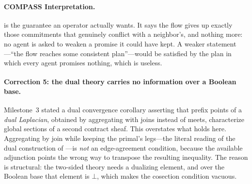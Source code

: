 \documentclass[11pt]{article}
\newif\ifshowcomments
\theoremstyle{definition}
\theoremstyle{remark}
\newcommand{\ai}[1]{%
    \ifshowcomments
        \noindent\textcolor{techred}{[AI Agent]: #1}%
    \fi
}
\begin{document}
\paragraph{COMPASS Interpretation.}
 is the guarantee an operator actually wants.
It says the flow gives up exactly those commitments that genuinely conflict with a neighbor's,
and nothing more: no agent is asked to weaken a promise it could have kept.
A weaker statement---``the flow reaches some consistent plan''---would be satisfied by the plan
in which every agent promises nothing, which is useless.

\paragraph{Correction 5: the dual theory carries no information over a Boolean base.}
Milestone~3 stated a dual convergence corollary asserting that prefix points of a
\emph{dual Laplacian}, obtained by aggregating with joins instead of meets, characterize global
sections of a second contract sheaf.
This overstates what holds here.
Aggregating by join while keeping the primal's legs---the literal reading of the dual construction of
\citet{ghristCategoricalDiffusionWeighted2026}---is \emph{not} an edge-agreement condition,
because the available adjunction points the wrong way to transpose the resulting inequality.
The reason is structural: the two-sided theory needs a dualizing element, and over the Boolean
base that element is $\bot$, which makes the cosection condition vacuous.

\ai{\textbf{Correction 5.} Concretely, and both recorded as tests:
\testname{test_kan_prefix_is_not_an_agreement_condition} exhibits an assignment that is a
prefix point of the join-aggregated primal Laplacian and is not a global section; and
\testname{test_harmonic_is_strictly_stronger_than_being_a_section} exhibits a strict global
section that is not harmonic, so the two-sided condition is strictly stronger than sectionhood
rather than a characterization of it. Milestone~3's dual corollary should be read as applying
only to the \emph{dual sheaf of \Cref{tab:two-sheaves}}---aggregating by join \emph{and}
transporting along $R^{\circ} \dashv R_*$---where it does hold, and where its prefix points are
exactly agreement of the $R_*$ images across every link
(\testname{test_co_prefix_points_are_ran_sections}).}
\end{document}
